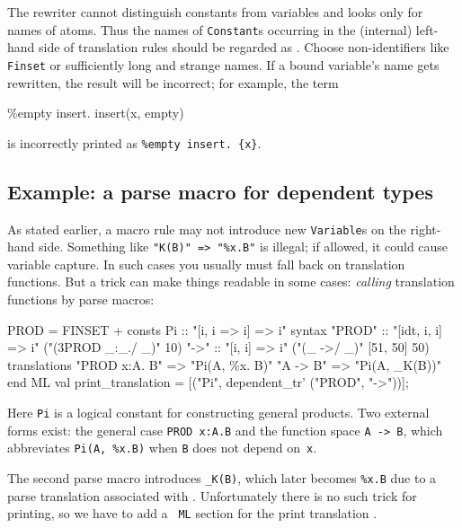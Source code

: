\begin{warn}
  The \AST{} rewriter cannot distinguish constants from variables and looks
  only for names of atoms.  Thus the names of {\tt Constant}s occurring in
  the (internal) left-hand side of translation rules should be regarded as
  .  Choose non-identifiers like {\tt\at Finset} or
  sufficiently long and strange names.  If a bound variable's name gets
  rewritten, the result will be incorrect; for example, the term
\begin{ttbox}
\%empty insert. insert(x, empty)
\end{ttbox}
\par\noindent is incorrectly printed as \verb|%empty insert. {x}|.
\end{warn}


\subsection{Example: a parse macro for dependent types}\label{prod_trans}

As stated earlier, a macro rule may not introduce new {\tt Variable}s on
the right-hand side.  Something like \verb|"K(B)" => "%x.B"| is illegal;
if allowed, it could cause variable capture.  In such cases you usually
must fall back on translation functions.  But a trick can make things
readable in some cases: {\em calling\/} translation functions by parse
macros:
\begin{ttbox}
PROD = FINSET +
consts
  Pi            :: "[i, i => i] => i"
syntax
  "{\at}PROD"       :: "[idt, i, i] => i"     ("(3PROD _:_./ _)" 10)
  "{\at}->"         :: "[i, i] => i"          ("(_ ->/ _)" [51, 50] 50)
\ttbreak
translations
  "PROD x:A. B" => "Pi(A, \%x. B)"
  "A -> B"      => "Pi(A, _K(B))"
end
ML
  val print_translation = [("Pi", dependent_tr' ("{\at}PROD", "{\at}->"))];
\end{ttbox}

Here {\tt Pi} is a logical constant for constructing general products.
Two external forms exist: the general case {\tt PROD x:A.B} and the
function space {\tt A -> B}, which abbreviates \verb|Pi(A, %x.B)| when {\tt B}
does not depend on~{\tt x}.

The second parse macro introduces {\tt _K(B)}, which later becomes
\verb|%x.B| due to a parse translation associated with .
Unfortunately there is no such trick for printing, so we have to add a {\tt
ML} section for the print translation .


